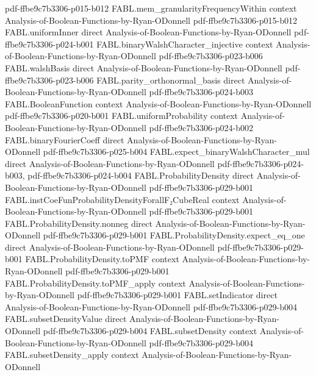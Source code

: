 \begin{theorem}
  {pdf-ffbe9c7b3306-p015-b012}
\proofstep
  {FABL.mem_granularityFrequencyWithin}
  {context}
  {Analysis-of-Boolean-Functions-by-Ryan-ODonnell}
  {pdf-ffbe9c7b3306-p015-b012}
\proofstep
  {FABL.uniformInner}
  {direct}
  {Analysis-of-Boolean-Functions-by-Ryan-ODonnell}
  {pdf-ffbe9c7b3306-p024-b001}
\proofstep
  {FABL.binaryWalshCharacter_injective}
  {context}
  {Analysis-of-Boolean-Functions-by-Ryan-ODonnell}
  {pdf-ffbe9c7b3306-p023-b006}
\proofstep
  {FABL.walshBasis}
  {direct}
  {Analysis-of-Boolean-Functions-by-Ryan-ODonnell}
  {pdf-ffbe9c7b3306-p023-b006}
\proofstep
  {FABL.parity_orthonormal_basis}
  {direct}
  {Analysis-of-Boolean-Functions-by-Ryan-ODonnell}
  {pdf-ffbe9c7b3306-p024-b003}
\proofstep
  {FABL.BooleanFunction}
  {context}
  {Analysis-of-Boolean-Functions-by-Ryan-ODonnell}
  {pdf-ffbe9c7b3306-p020-b001}
\proofstep
  {FABL.uniformProbability}
  {context}
  {Analysis-of-Boolean-Functions-by-Ryan-ODonnell}
  {pdf-ffbe9c7b3306-p024-b002}
\proofstep
  {FABL.binaryFourierCoeff}
  {direct}
  {Analysis-of-Boolean-Functions-by-Ryan-ODonnell}
  {pdf-ffbe9c7b3306-p025-b004}
\proofstep
  {FABL.expect_binaryWalshCharacter_mul}
  {direct}
  {Analysis-of-Boolean-Functions-by-Ryan-ODonnell}
  {pdf-ffbe9c7b3306-p024-b003,
    pdf-ffbe9c7b3306-p024-b004}
\proofstep
  {FABL.ProbabilityDensity}
  {direct}
  {Analysis-of-Boolean-Functions-by-Ryan-ODonnell}
  {pdf-ffbe9c7b3306-p029-b001}
\proofstep
  {FABL.instCoeFunProbabilityDensityForallF₂CubeReal}
  {context}
  {Analysis-of-Boolean-Functions-by-Ryan-ODonnell}
  {pdf-ffbe9c7b3306-p029-b001}
\proofstep
  {FABL.ProbabilityDensity.nonneg}
  {direct}
  {Analysis-of-Boolean-Functions-by-Ryan-ODonnell}
  {pdf-ffbe9c7b3306-p029-b001}
\proofstep
  {FABL.ProbabilityDensity.expect_eq_one}
  {direct}
  {Analysis-of-Boolean-Functions-by-Ryan-ODonnell}
  {pdf-ffbe9c7b3306-p029-b001}
\proofstep
  {FABL.ProbabilityDensity.toPMF}
  {context}
  {Analysis-of-Boolean-Functions-by-Ryan-ODonnell}
  {pdf-ffbe9c7b3306-p029-b001}
\proofstep
  {FABL.ProbabilityDensity.toPMF_apply}
  {context}
  {Analysis-of-Boolean-Functions-by-Ryan-ODonnell}
  {pdf-ffbe9c7b3306-p029-b001}
\proofstep
  {FABL.setIndicator}
  {direct}
  {Analysis-of-Boolean-Functions-by-Ryan-ODonnell}
  {pdf-ffbe9c7b3306-p029-b004}
\proofstep
  {FABL.subsetDensityValue}
  {direct}
  {Analysis-of-Boolean-Functions-by-Ryan-ODonnell}
  {pdf-ffbe9c7b3306-p029-b004}
\proofstep
  {FABL.subsetDensity}
  {context}
  {Analysis-of-Boolean-Functions-by-Ryan-ODonnell}
  {pdf-ffbe9c7b3306-p029-b004}
\proofstep
  {FABL.subsetDensity_apply}
  {context}
  {Analysis-of-Boolean-Functions-by-Ryan-ODonnell}

\end{theorem}
